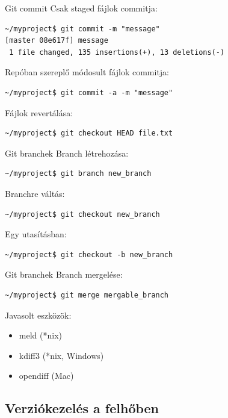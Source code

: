 \documentclass[display,t]{beamer}
\begin{document}
\begin{frame}[fragile]{Git commit}
    \pause
    Csak staged fájlok commitja:
\small\begin{verbatim}
~/myproject$ git commit -m "message"
[master 08e617f] message
 1 file changed, 135 insertions(+), 13 deletions(-)
\end{verbatim}\normalsize
    \pause
    
    Repóban szereplő módosult fájlok commitja:
\small\begin{verbatim}
~/myproject$ git commit -a -m "message"
\end{verbatim}\normalsize
    \pause

    Fájlok revertálása:
\small\begin{verbatim}
~/myproject$ git checkout HEAD file.txt
\end{verbatim}\normalsize
\end{frame}

\begin{frame}[fragile]{Git branchek}
    \pause
    Branch létrehozása:
\small\begin{verbatim}
~/myproject$ git branch new_branch
\end{verbatim}\normalsize

    \pause
    Branchre váltás:
\small\begin{verbatim}
~/myproject$ git checkout new_branch
\end{verbatim}\normalsize

    \pause
    Egy utasításban:
\small\begin{verbatim}
~/myproject$ git checkout -b new_branch
\end{verbatim}\normalsize
\end{frame}

\begin{frame}[fragile]{Git branchek}
    \pause
    Branch mergelése:
\small\begin{verbatim}
~/myproject$ git merge mergable_branch
\end{verbatim}\normalsize

    \pause
    Javasolt eszközök:
    \begin{itemize}
        \item meld (*nix)
        \item kdiff3 (*nix, Windows)
        \item opendiff (Mac)
    \end{itemize}
\end{frame}

\subsection{Verziókezelés a felhőben}
\end{document}
